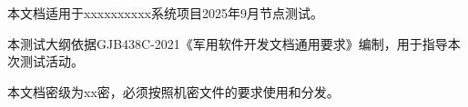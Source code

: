

本文档适用于xxxxxxxxxx系统项目2025年9月节点测试。

本测试大纲依据GJB438C-2021《军用软件开发文档通用要求》编制，用于指导本次测试活动。

本文档密级为xx密，必须按照机密文件的要求使用和分发。
